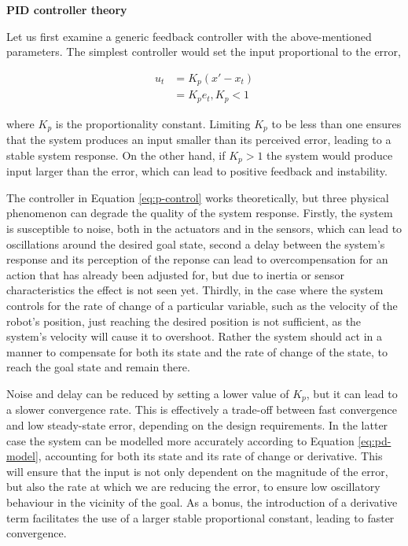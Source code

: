 \textbf{PID controller theory}

Let us first examine a generic feedback controller with the above-mentioned parameters. The simplest controller would set the input proportional to the error,

\begin{align}
    u_t &= K_p (x' - x_t) \\
    &= K_p e_t, K_p < 1
    \label{eq:p-control}
\end{align}

where $K_p$ is the proportionality constant. Limiting $K_p$ to be less than one ensures that the system produces an input smaller than its perceived error, leading to a stable system response. On the other hand, if $K_p > 1$ the system would produce input larger than the error, which can lead to positive feedback and instability. 

The controller in Equation \ref{eq:p-control} works theoretically, but three physical phenomenon can degrade the quality of the system response. Firstly, the system is susceptible to noise, both in the actuators and in the sensors, which can lead to oscillations around the desired goal state, second a delay between the system's response and its perception of the reponse can lead to overcompensation for an action that has already been adjusted for, but due to inertia or sensor characteristics the effect is not seen yet. Thirdly, in the case where the system controls for the rate of change of a particular variable, such as the velocity of the robot's position, just reaching the desired position is not sufficient, as the system's velocity will cause it to overshoot. Rather the system should act in a manner to compensate for both its state and the rate of change of the state, to reach the goal state and remain there.

Noise and delay can be reduced by setting a lower value of $K_p$, but it can lead to a slower convergence rate. This is effectively a trade-off between fast convergence and low steady-state error, depending on the design requirements. In the latter case the system can be modelled more accurately according to Equation \ref{eq:pd-model}, accounting for both its state and its rate of change or derivative. This will ensure that the input is not only dependent on the magnitude of the error, but also the rate at which we are reducing the error, to ensure low oscillatory behaviour in the vicinity of the goal. As a bonus, the introduction of a derivative term facilitates the use of a larger stable proportional constant, leading to faster convergence.

